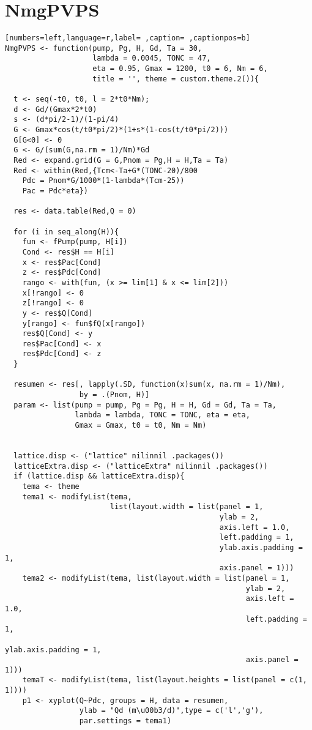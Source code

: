 \section{NmgPVPS}
\label{sec:org70bb1b9}
\begin{lstlisting}[numbers=left,language=r,label= ,caption= ,captionpos=b]
NmgPVPS <- function(pump, Pg, H, Gd, Ta = 30,
                    lambda = 0.0045, TONC = 47,
                    eta = 0.95, Gmax = 1200, t0 = 6, Nm = 6,
                    title = '', theme = custom.theme.2()){

  t <- seq(-t0, t0, l = 2*t0*Nm);
  d <- Gd/(Gmax*2*t0)
  s <- (d*pi/2-1)/(1-pi/4)
  G <- Gmax*cos(t/t0*pi/2)*(1+s*(1-cos(t/t0*pi/2)))
  G[G<0] <- 0
  G <- G/(sum(G,na.rm = 1)/Nm)*Gd
  Red <- expand.grid(G = G,Pnom = Pg,H = H,Ta = Ta)
  Red <- within(Red,{Tcm<-Ta+G*(TONC-20)/800
    Pdc = Pnom*G/1000*(1-lambda*(Tcm-25))
    Pac = Pdc*eta})                    

  res <- data.table(Red,Q = 0)

  for (i in seq_along(H)){
    fun <- fPump(pump, H[i])
    Cond <- res$H == H[i]
    x <- res$Pac[Cond]
    z <- res$Pdc[Cond]
    rango <- with(fun, (x >= lim[1] & x <= lim[2])) 
    x[!rango] <- 0
    z[!rango] <- 0
    y <- res$Q[Cond]
    y[rango] <- fun$fQ(x[rango])
    res$Q[Cond] <- y
    res$Pac[Cond] <- x
    res$Pdc[Cond] <- z
  }

  resumen <- res[, lapply(.SD, function(x)sum(x, na.rm = 1)/Nm),
                 by = .(Pnom, H)]
  param <- list(pump = pump, Pg = Pg, H = H, Gd = Gd, Ta = Ta,
                lambda = lambda, TONC = TONC, eta = eta,
                Gmax = Gmax, t0 = t0, Nm = Nm)


  lattice.disp <- ("lattice" nilinnil .packages())
  latticeExtra.disp <- ("latticeExtra" nilinnil .packages())
  if (lattice.disp && latticeExtra.disp){
    tema <- theme
    tema1 <- modifyList(tema,
                        list(layout.width = list(panel = 1,
                                                 ylab = 2,
                                                 axis.left = 1.0,
                                                 left.padding = 1,
                                                 ylab.axis.padding = 1,
                                                 axis.panel = 1)))
    tema2 <- modifyList(tema, list(layout.width = list(panel = 1,
                                                       ylab = 2,
                                                       axis.left = 1.0,
                                                       left.padding = 1,
                                                       ylab.axis.padding = 1,
                                                       axis.panel = 1)))
    temaT <- modifyList(tema, list(layout.heights = list(panel = c(1, 1))))
    p1 <- xyplot(Q~Pdc, groups = H, data = resumen,
                 ylab = "Qd (m\u00b3/d)",type = c('l','g'),
                 par.settings = tema1)


\end{lstlisting}
